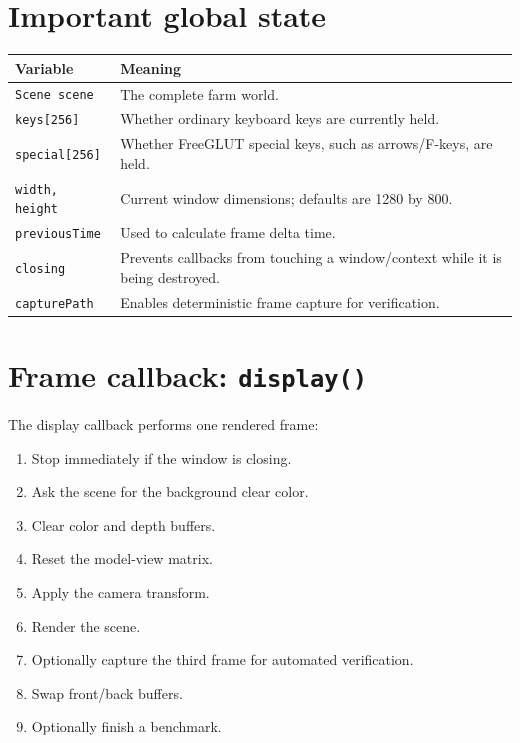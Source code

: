 \documentclass[11pt,a4paper,openany]{book}
\newcommand{\code}[1]{\texttt{#1}}
\begin{document}
\section{Important global state}
\begin{tabularx}{\textwidth}{@{}lX@{}}
	\toprule
	Variable             & Meaning                                                                        \\
	\midrule
	\code{Scene scene}   & The complete farm world.                                                       \\
	\code{keys[256]}     & Whether ordinary keyboard keys are currently held.                             \\
	\code{special[256]}  & Whether FreeGLUT special keys, such as arrows/F-keys, are held.                \\
	\code{width, height} & Current window dimensions; defaults are 1280 by 800.                           \\
	\code{previousTime}  & Used to calculate frame delta time.                                            \\
	\code{closing}       & Prevents callbacks from touching a window/context while it is being destroyed. \\
	\code{capturePath}   & Enables deterministic frame capture for verification.                          \\
	\bottomrule
\end{tabularx}

\section{Frame callback: \texttt{display()}}
The display callback performs one rendered frame:
\begin{enumerate}
	\item Stop immediately if the window is closing.
	\item Ask the scene for the background clear color.
	\item Clear color and depth buffers.
	\item Reset the model-view matrix.
	\item Apply the camera transform.
	\item Render the scene.
	\item Optionally capture the third frame for automated verification.
	\item Swap front/back buffers.
	\item Optionally finish a benchmark.
\end{enumerate}
\end{document}
